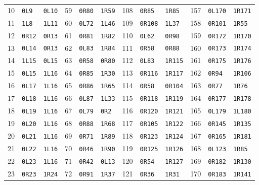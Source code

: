 \begin{center}
\begin{tabular}{rll@{\hspace{12pt}}rll@{\hspace{12pt}}rll@{\hspace{12pt}}rll}
10 & \texttt{0L9} & \texttt{0L10} & 59 & \texttt{0R80} & \texttt{1R59} & 108 & \texttt{0R85} & \texttt{1R85} & 157 & \texttt{0L170} & \texttt{1R171}\\
11 & \texttt{1L8} & \texttt{1L11} & 60 & \texttt{0L72} & \texttt{1L46} & 109 & \texttt{0R108} & \texttt{1L37} & 158 & \texttt{0R101} & \texttt{1R55}\\
12 & \texttt{0R12} & \texttt{0R13} & 61 & \texttt{0R81} & \texttt{1R82} & 110 & \texttt{0L62} & \texttt{0R98} & 159 & \texttt{0R172} & \texttt{1R170}\\
13 & \texttt{0L14} & \texttt{0R13} & 62 & \texttt{0L83} & \texttt{1R84} & 111 & \texttt{0R58} & \texttt{0R88} & 160 & \texttt{0R173} & \texttt{1R174}\\
14 & \texttt{1L15} & \texttt{0L15} & 63 & \texttt{0R58} & \texttt{0R80} & 112 & \texttt{0L83} & \texttt{1R115} & 161 & \texttt{0R175} & \texttt{1R176}\\
15 & \texttt{0L15} & \texttt{1L16} & 64 & \texttt{0R85} & \texttt{1R30} & 113 & \texttt{0R116} & \texttt{1R117} & 162 & \texttt{0R94} & \texttt{1R106}\\
16 & \texttt{0L17} & \texttt{1L16} & 65 & \texttt{0R86} & \texttt{1R65} & 114 & \texttt{0R58} & \texttt{0R104} & 163 & \texttt{0R77} & \texttt{1R76}\\
17 & \texttt{0L18} & \texttt{1L16} & 66 & \texttt{0L87} & \texttt{1L33} & 115 & \texttt{0R118} & \texttt{1R119} & 164 & \texttt{0R177} & \texttt{1R178}\\
18 & \texttt{0L19} & \texttt{1L16} & 67 & \texttt{0L79} & \texttt{0R2} & 116 & \texttt{0R120} & \texttt{1R121} & 165 & \texttt{0L179} & \texttt{1L180}\\
19 & \texttt{0L20} & \texttt{1L16} & 68 & \texttt{0R88} & \texttt{1R68} & 117 & \texttt{0R105} & \texttt{1R122} & 166 & \texttt{0R145} & \texttt{1R135}\\
20 & \texttt{0L21} & \texttt{1L16} & 69 & \texttt{0R71} & \texttt{1R89} & 118 & \texttt{0R123} & \texttt{1R124} & 167 & \texttt{0R165} & \texttt{1R181}\\
21 & \texttt{0L22} & \texttt{1L16} & 70 & \texttt{0R46} & \texttt{1R90} & 119 & \texttt{0R125} & \texttt{1R126} & 168 & \texttt{0L123} & \texttt{1R85}\\
22 & \texttt{0L23} & \texttt{1L16} & 71 & \texttt{0R42} & \texttt{0L13} & 120 & \texttt{0R54} & \texttt{1R127} & 169 & \texttt{0R182} & \texttt{1R130}\\
23 & \texttt{0R23} & \texttt{1R24} & 72 & \texttt{0R91} & \texttt{1R37} & 121 & \texttt{0R36} & \texttt{1R31} & 170 & \texttt{0R183} & \texttt{1R141}\\

\end{tabular}
\end{center}
